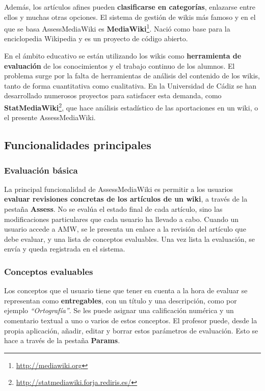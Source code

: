 \documentclass[11pt]{article}
\begin{document}
Además, los artículos afines pueden \textbf{clasificarse en categorías},
enlazarse entre ellos y muchas otras opciones. El sistema de gestión de wikis
más famoso y en el que se basa AssessMediaWiki es
\textbf{MediaWiki}\footnote{\url{http://mediawiki.org}}. Nació como base para la
enciclopedia Wikipedia y es un proyecto de código abierto.

En el ámbito educativo se están utilizando los wikis como \textbf{herramienta de
  evaluación} de los conocimientos y el trabajo continuo de los alumnos. El
problema surge por la falta de herramientas de análisis del contenido de los
wikis, tanto de forma cuantitativa como cualitativa. En la Universidad de Cádiz
se han desarrollado numerosos proyectos para satisfacer esta demanda, como
\textbf{StatMediaWiki}\footnote{\url{http://statmediawiki.forja.rediris.es/}},
que hace análisis estadístico de las aportaciones en un wiki, o el presente
AssessMediaWiki.

\subsection{Funcionalidades principales}

\subsubsection{Evaluación básica}

La principal funcionalidad de AssessMediaWiki es permitir a los usuarios
\textbf{evaluar revisiones concretas de los artículos de un wiki}, a través de
la pestaña \textbf{Assess}. No se evalúa el estado final de cada artículo, sino
las modificaciones particulares que cada usuario ha llevado a cabo. Cuando un
usuario accede a AMW, se le presenta un enlace a la revisión del artículo que
debe evaluar, y una lista de conceptos evaluables. Una vez lista la evaluación,
se envía y queda registrada en el sistema.

\subsubsection{Conceptos evaluables}

Los conceptos que el usuario tiene que tener en cuenta a la hora de evaluar se
representan como \textbf{entregables}, con un título y una descripción, como por
ejemplo \textit{``Ortografía''}. Se les puede asignar una calificación numérica
y un comentario textual a uno o varios de estos conceptos. El profesor puede,
desde la propia aplicación, añadir, editar y borrar estos parámetros de
evaluación. Esto se hace a través de la pestaña \textbf{Params}.
\end{document}
